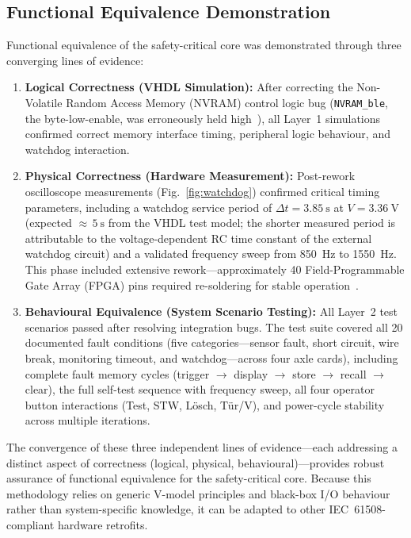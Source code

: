 \documentclass[journal, a4paper]{IEEEtran}
\newcommand{\VHDL}{VHDL}
\newif\iffirstFPGA  \firstFPGAtrue
\newcommand{\FPGA}{\iffirstFPGA Field-Programmable Gate Array (FPGA)\global\firstFPGAfalse\else FPGA\fi}
\newif\iffirstNVRAM \firstNVRAMtrue
\newcommand{\NVRAM}{\iffirstNVRAM Non-Volatile Random Access Memory (NVRAM)\global\firstNVRAMfalse\else NVRAM\fi}
\begin{document}
\subsection{Functional Equivalence Demonstration}

Functional equivalence of the safety-critical core was demonstrated through three converging lines of evidence:

\begin{enumerate}[nosep]
  \item \textbf{Logical Correctness (\VHDL{} Simulation):} After correcting the \NVRAM{} control logic bug (\texttt{NVRAM\_ble}, the byte-low-enable, was erroneously held high~\cite{savchuk2025}), all Layer~1 simulations confirmed correct memory interface timing, peripheral logic behaviour, and watchdog interaction.
  \item \textbf{Physical Correctness (Hardware Measurement):} Post-rework oscilloscope measurements (Fig.~\ref{fig:watchdog}) confirmed critical timing parameters, including a watchdog service period of $\Delta t = \SI{3.85}{\second}$ at $V = \SI{3.36}{\volt}$ (expected ${\approx}\,\SI{5}{\second}$ from the \VHDL{} test model; the shorter measured period is attributable to the voltage-dependent RC time constant of the external watchdog circuit) and a validated frequency sweep from \SI{850}{\hertz} to \SI{1550}{\hertz}. This phase included extensive rework---approximately 40 \FPGA{} pins required re-soldering for stable operation~\cite{savchuk2025}.
  \item \textbf{Behavioural Equivalence (System Scenario Testing):} All Layer~2 test scenarios passed after resolving integration bugs. The test suite covered all 20 documented fault conditions (five categories---sensor fault, short circuit, wire break, monitoring timeout, and watchdog---across four axle cards), including complete fault memory cycles (trigger $\rightarrow$ display $\rightarrow$ store $\rightarrow$ recall $\rightarrow$ clear), the full self-test sequence with frequency sweep, all four operator button interactions (Test, STW, L\"osch, T\"ur/V), and power-cycle stability across multiple iterations.
\end{enumerate}

The convergence of these three independent lines of evidence---each addressing a distinct aspect of correctness (logical, physical, behavioural)---provides robust assurance of functional equivalence for the safety-critical core. Because this methodology relies on generic V-model principles and black-box I/O behaviour rather than system-specific knowledge, it can be adapted to other IEC~61508-compliant hardware retrofits.
\end{document}
